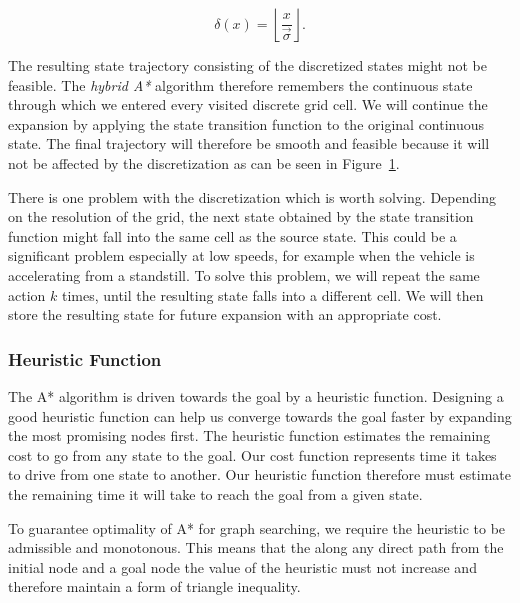 \[
\delta(x) = \left\lfloor \dfrac{x}{\vec{\sigma}} \right\rfloor.
\]

The resulting state trajectory consisting of the discretized states might not be feasible. The \textit{hybrid A*} algorithm therefore remembers the continuous state through which we entered every visited discrete grid cell. We will continue the expansion by applying the state transition function to the original continuous state. The final trajectory will therefore be smooth and feasible because it will not be affected by the discretization as can be seen in Figure~\ref{fig:hybrid_astar_discretized_vs_continuous}.

\begin{figure}
	\centering
	\caption{}
	\label{fig:hybrid_astar_discretized_vs_continuous}
\end{figure}

There is one problem with the discretization which is worth solving. Depending on the resolution of the grid, the next state obtained by the state transition function might fall into the same cell as the source state. This could be a significant problem especially at low speeds, for example when the vehicle is accelerating from a standstill. To solve this problem, we will repeat the same action $k$ times, until the resulting state falls into a different cell. We will then store the resulting state for future expansion with an appropriate cost.

\subsubsection{Heuristic Function}

The A* algorithm is driven towards the goal by a heuristic function. Designing a good heuristic function can help us converge towards the goal faster by expanding the most promising nodes first. The heuristic function estimates the remaining cost to go from any state to the goal. Our cost function represents time it takes to drive from one state to another. Our heuristic function therefore must estimate the remaining time it will take to reach the goal from a given state.

To guarantee optimality of A* for graph searching, we require the heuristic to be admissible and monotonous. This means that the along any direct path from the initial node and a goal node the value of the heuristic must not increase and therefore maintain a form of triangle inequality.

